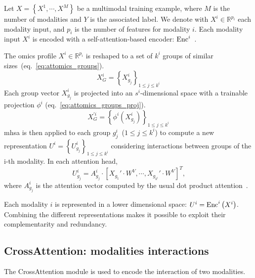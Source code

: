 \documentclass[../main.tex]{subfiles}
\begin{document}
     Let \( X = \left\{X^{1}, \cdots, X^{M} \right\} \) be a multimodal training example, where \(M\) is the number of modalities and \(Y\) is the associated label.
     We denote with \(X^{i} \in \mathbb{R}^{p_i}\) each modality input, and $p_i$ is the number of features for modality $i$.
     Each modality input \(X^{i}\) is encoded with a self-attention-based encoder: \(\operatorname{Enc}^{i}\)~\cite{AttOmics}.

     The omics profile \(X^{i} \in \mathbb{R}^{p_i} \) is reshaped to a set of $k^i$ groups of similar sizes~(eq.~\ref{eq:attomics_groups}).
     \begin{equation}
         X^{i}_{G} = \left\{X^{i}_{g_j} \right\}_{1\leq j\leq k^i}\label{eq:attomics_groups}
     \end{equation}
     Each group vector $X^{i}_{g_j}$ is projected into an $s^i$-dimensional space with a trainable projection \(\phi^i\) (eq.~\ref{eq:attomics_groups_proj}).
     \begin{equation}
         X^{'i}_{G} = \left\{\phi^i\left(X^{i}_{g_j} \right) \right\}_{1\leq j\leq k^i}\label{eq:attomics_groups_proj}
     \end{equation}
     \Gls{mhsa} is then applied to each group \(g^i_j\)~(\(1 \leq j \leq k^i \)) to compute a new representation \({U^i = \left\{ U^i_{g_j}\right\}_{1 \leq j \leq k^i}}\) considering interactions between groups of the i-th modality.
     In each attention head,
     \begin{equation}
         U^{i}_{g_j} = A^{i}_{g_j} \cdot \left[ X_{g_1}' \cdot W^V, \cdots ,  X_{g_{k^i}}' \cdot W^V\right]^T \text{,}\label{eq:enc_mhsa}
     \end{equation}
     where $A^{i}_{g_j}$ is the attention vector computed by the usual dot product attention~\cite{AttentionAllYouNeed}.

     Each modality $i$ is represented in a lower dimensional space: \(U^{i} = \operatorname{Enc}^{i}\left(X^{i}\right)\).
     Combining the different representations makes it possible to exploit their complementarity and redundancy.

 \subsection{CrossAttention: modalities interactions}
     The CrossAttention module is used to encode the interaction of two modalities.
\end{document}
